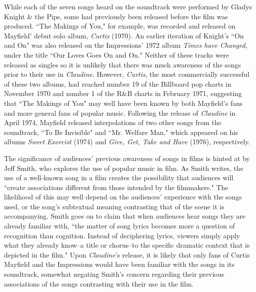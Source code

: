 While each of the seven songs heard on the soundtrack were performed by Gladys Knight \& the Pips, some had previously been released before the film was produced.
``The Makings of You," for example, was recorded and released on Mayfield' debut solo album, \textit{Curtis} (1970).
An earlier iteration of Knight's ``On and On" was also released on the Impressions' 1972 album \textit{Times have Changed}, under the title ``Our Loves Goes On and On."
Neither of these tracks were released as singles so it is unlikely that there was much awareness of the songs prior to their use in \textit{Claudine}.
However, \textit{Curtis}, the most commercially successful of these two albums, had reached number 19 of the Billboard pop charts in November 1970 and number 1 of the R\&B charts in February 1971, suggesting that ``The Makings of You" may well have been known by both Mayfield's fans and more general fans of popular music.\autocite[][]{noauthor_curtis_nodate} 
Following the release of \textit{Claudine} in April 1974, Mayfield released interpolations of two other songs from the soundtrack, ``To Be Invisible" and ``Mr. Welfare Man," which appeared on his albums \textit{Sweet Exorcist} (1974) and \textit{Give, Get, Take and Have} (1976), respectively.

The significance of audiences' previous awareness of songs in films is hinted at by Jeff Smith, who explores the use of popular music in film.
As Smith writes, the use of a well-known song in a film creates the possibility that audiences will ``create associations different from those intended by the filmmakers."\autocite[][166]{smith_sounds_1998}
The likelihood of this may well depend on the audiences' experience with the songs used, or the song's subtextual meaning contrasting that of the scene it is accompanying.
Smith goes on to claim that when audiences hear songs they are already familiar with, ``the matter of song lyrics becomes more a question of recognition than cognition. Instead of deciphering lyrics, viewers simply apply what they already know–a title or chorus–to the specific dramatic context that is depicted in the film."\autocite[][166]{smith_sounds_1998}
Upon \textit{Claudine}'s release, it is likely that only fans of Curtis Mayfield and the Impressions would have been familiar with the songs in its soundtrack, somewhat negating Smith's concern regarding their previous associations of the songs contrasting with their use in the film.

